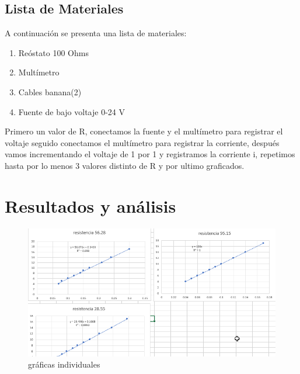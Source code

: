 \documentclass{article}
\begin{document}
\begin{multicols}{2}
\subsection*{Lista de Materiales}
A continuación se presenta una lista de materiales:
\begin{enumerate}
    \item Reóstato 100 Ohms 
    \item Multímetro
    \item Cables banana(2)
    \item Fuente de bajo voltaje 0-24 V
\end{enumerate}
Primero un valor de R, conectamos la fuente y el multímetro para registrar el voltaje
seguido conectamos el multímetro para registrar la corriente, después vamos incrementando el voltaje 
de 1 por 1 y registramos la corriente i, repetimos hasta por lo menos 3 valores distinto de R y por ultimo graficados.  
 \end{multicols}
\section{Resultados y análisis}\label{Resultados}			%

\begin{figure}[H]
    \centering
    \includegraphics[scale=0.7]{../imgs/r0.png}
    \caption{gráficas individuales}
    \label{fig:1}
\end{figure}
\end{document}
